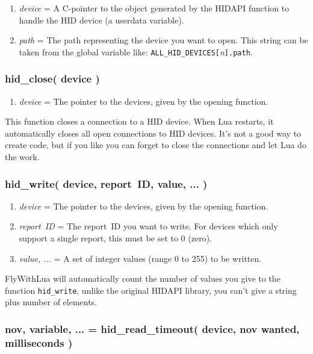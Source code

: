 \documentclass[11pt,parskip=half,a4paper]{scrartcl}
\begin{document}
\begin{enumerate}
\item \emph{device} = A C-pointer to the object generated by the HIDAPI function to handle the HID device (a userdata variable).
\item \emph{path} = The path representing the device you want to open. This string can be taken from the global variable like: \verb|ALL_HID_DEVICES[|\emph{n}\verb|].path|.
\end{enumerate}

\subsubsection{hid\_close( device )}

\begin{enumerate}
\item \emph{device} = The pointer to the devices, given by the opening function.
\end{enumerate}

This function closes a connection to a HID device. When Lua restarts, it automatically closes all open connections to HID devices. It's not a good way to create code, but if you like you can forget to close the connections and let Lua do the work.

\subsubsection{hid\_write( device, report~ID, value, ... )}

\begin{enumerate}
\item \emph{device} = The pointer to the devices, given by the opening function.
\item \emph{report~ID} = The report~ID you want to write. For devices which only support a single report, this must be set to 0 (zero).
\item \emph{value, ...} = A set of integer values (range 0 to 255) to be written.
\end{enumerate}

FlyWithLua will automatically count the number of values you give to the function \verb|hid_write|, unlike the original HIDAPI library, you can't give a string plus number of elements.

\subsubsection{nov, variable, ... = hid\_read\_timeout( device, nov wanted, milliseconds )}
\end{document}
